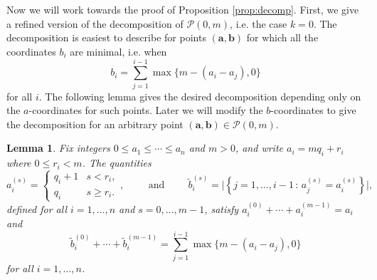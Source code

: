 \documentclass[12pt]{amsart}
\newcommand{\aaa}{\mathbf{a}}
\newcommand{\bbb}{\mathbf{b}}
\numberwithin{equation}{section}
\newtheorem{lemma}[theorem]{Lemma}
\theoremstyle{definition}
\begin{document}
Now we will work towards the proof of Proposition \ref{prop:decomp}. First, we give a refined version of the decomposition of $\mathcal{P}(0,m)$, i.e. the case $k=0$. The decomposition is easiest to describe for points $(\aaa,\bbb)$ for which all the coordinates $b_i$ are minimal, i.e. when 
\[ b_i = \sum_{j=1}^{i-1}\max\{m-(a_i-a_j),0\} \]
for all $i$. The following lemma gives the desired decomposition depending only on the $a$-coordinates for such points. Later we will modify the $b$-coordinates   to give the decomposition for an arbitrary point $(\aaa,\bbb)\in \mathcal{P}(0,m).$

\begin{lemma}\label{lem:div with remainder}
    Fix integers $0\leq a_1\leq \cdots \leq a_n$ and $m> 0$, and write $a_i = mq_i+r_i$ where $0\leq r_i<m$. The quantities
    \[ a_i^{(s)}=\begin{cases}
    q_i+1 & s<r_i,\\
    q_i & s\ge r_i.
    \end{cases},
    \hspace{1cm} \text{and} \hspace{1cm}
    \tilde{b}^{(s)}_i = \big|\left\{ j=1,\dots,i-1 \, : \, a^{(s)}_j = a^{(s)}_i\right\}\big|, \]
    defined for all $i=1,\dots,n$ and $s=0,\dots,m-1$, satisfy $a^{(0)}_i+\cdots+a^{(m-1)}_i = a_i$ and 
    \[ \tilde{b}^{(0)}_i+\cdots+\tilde{b}^{(m-1)}_i = \sum_{j=1}^{i-1}\max\{m-(a_i-a_j),0\} \]
    for all $i=1,\dots,n$.
\end{lemma}
\end{document}
